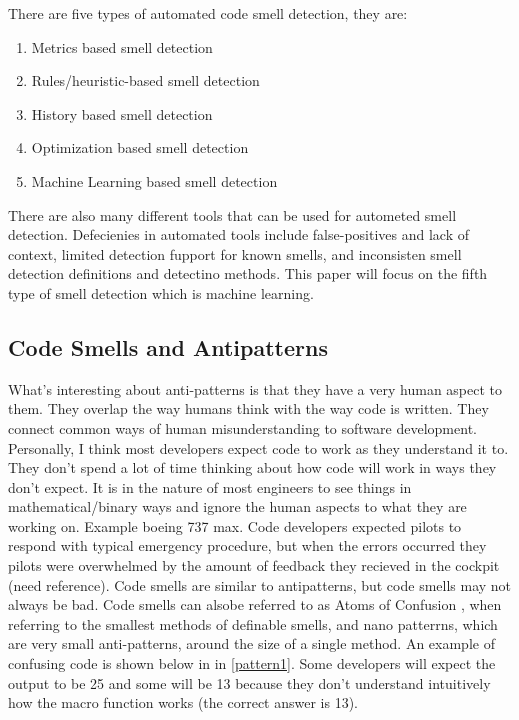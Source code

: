 \documentclass[conference]{IEEEtran}
\begin{document}
There are five types of automated code smell detection\cite{lafi_code_2019}, they are:
\begin{enumerate}
\item Metrics based smell detection
\item Rules/heuristic-based smell detection
\item History based smell detection
\item Optimization based smell detection
\item Machine Learning based smell detection
\end{enumerate}
There are also many different tools\cite{walter_code_2018} that can be used for autometed smell detection.
Defecienies in automated tools include false-positives and lack of context, limited detection fupport for known smells, and inconsisten smell detection definitions and detectino methods\cite{sharma_detecting_2018}.
This paper will focus on the fifth type of smell detection which is machine learning.

\subsection{Code Smells and Antipatterns}
What's interesting about anti-patterns is that they have a very human aspect to them. 
They overlap the way humans think with the way code is written. 
They connect common ways of human misunderstanding to software development. 
Personally, I think most developers expect code to work as they understand it to. 
They don't spend a lot of time thinking about how code will work in ways they don't expect.
It is in the nature of most engineers to see things in mathematical/binary ways and ignore the human aspects to what they are working on.
Example boeing 737 max.
Code developers expected pilots to respond with typical emergency procedure, but when the errors occurred they pilots were overwhelmed by the amount of feedback they recieved in the cockpit (need reference).
Code smells are similar to antipatterns, but code smells may not always be bad.
Code smells can alsobe referred to as Atoms of Confusion \cite{gopstein_understanding_2017}, when referring to the smallest methods of definable smells, and nano patterrns, which are very small anti-patterns, around the size of a single method. 
An example of confusing code is shown below in in \ref{pattern1}.
Some developers will expect the output to be 25 and some will be 13 because they don't understand intuitively how the macro function works (the correct answer is 13).
\end{document}
